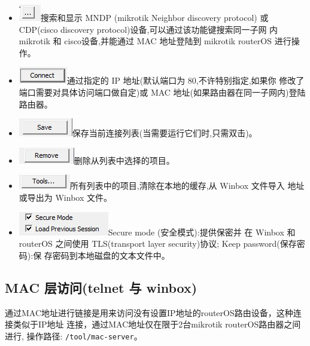 \begin{itemize}
\item\includegraphics{pic/winbox1.png}搜索和显示 MNDP (mikrotik Neighbor discovery
  protocol) 或 CDP(cisco discovery protocol)设备,可以通过该功能键搜索同一子网
  内 mikrotik 和 cisco设备,并能通过 MAC 地址登陆到 mikrotik routerOS 进行操作。
\item \includegraphics{pic/winbox2.png}通过指定的 IP 地址(默认端口为 80,不许特别指定,如果你
  修改了端口需要对具体访问端口做自定)或 MAC 地址(如果路由器在同一子网内)登陆路由器。
\item \includegraphics{pic/winbox3.png}保存当前连接列表(当需要运行它们时,只需双击)。
\item \includegraphics{pic/winbox4.png}删除从列表中选择的项目。
\item \includegraphics{pic/winbox5.png}所有列表中的项目,清除在本地的缓存,从 Winbox 文件导入
  地址或导出为 Winbox 文件。
\item \includegraphics{pic/winbox6.png}Secure mode (安全模式):提供保密并
  在 Winbox 和routerOS 之间使用 TLS(transport layer security)协议; Keep password(保存密码):保
  存密码到本地磁盘的文本文件中。
\end{itemize}

\subsection{MAC 层访问(telnet 与 winbox)}

通过MAC地址进行链接是用来访问没有设置IP地址的routerOS路由设备，这种连接类似于IP地址
连接，通过MAC地址仅在限于2台mikrotik routerOS路由器之间进行, 操作路径: \verb|/tool/mac-server|。

